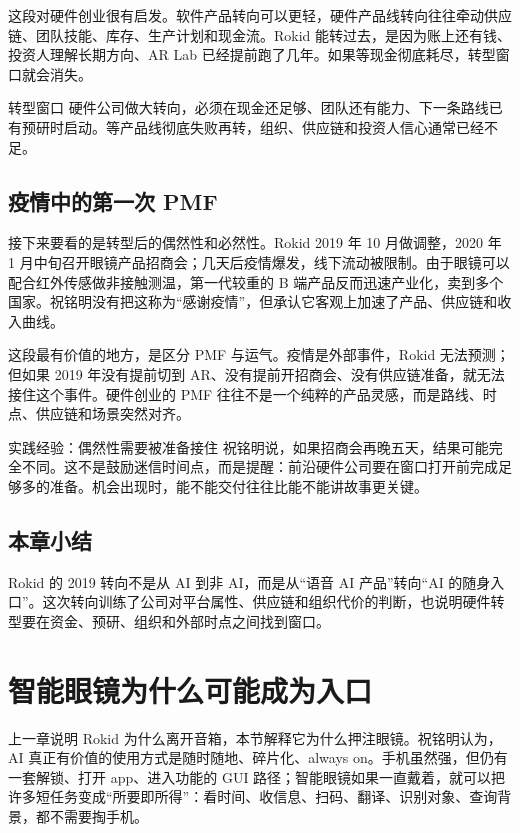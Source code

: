 \documentclass[a4paper]{article}
\begin{document}
这段对硬件创业很有启发。软件产品转向可以更轻，硬件产品线转向往往牵动供应链、团队技能、库存、生产计划和现金流。Rokid 能转过去，是因为账上还有钱、投资人理解长期方向、AR Lab 已经提前跑了几年。如果等现金彻底耗尽，转型窗口就会消失。

\begin{importantbox}{转型窗口}
硬件公司做大转向，必须在现金还足够、团队还有能力、下一条路线已有预研时启动。等产品线彻底失败再转，组织、供应链和投资人信心通常已经不足。
\end{importantbox}

\subsection{疫情中的第一次 PMF}

接下来要看的是转型后的偶然性和必然性。Rokid 2019 年 10 月做调整，2020 年 1 月中旬召开眼镜产品招商会；几天后疫情爆发，线下流动被限制。由于眼镜可以配合红外传感做非接触测温，第一代较重的 B 端产品反而迅速产业化，卖到多个国家。祝铭明没有把这称为“感谢疫情”，但承认它客观上加速了产品、供应链和收入曲线。

这段最有价值的地方，是区分 PMF 与运气。疫情是外部事件，Rokid 无法预测；但如果 2019 年没有提前切到 AR、没有提前开招商会、没有供应链准备，就无法接住这个事件。硬件创业的 PMF 往往不是一个纯粹的产品灵感，而是路线、时点、供应链和场景突然对齐。

\begin{knowledgebox}{实践经验：偶然性需要被准备接住}
祝铭明说，如果招商会再晚五天，结果可能完全不同。这不是鼓励迷信时间点，而是提醒：前沿硬件公司要在窗口打开前完成足够多的准备。机会出现时，能不能交付往往比能不能讲故事更关键。
\end{knowledgebox}

\subsection{本章小结}

Rokid 的 2019 转向不是从 AI 到非 AI，而是从“语音 AI 产品”转向“AI 的随身入口”。这次转向训练了公司对平台属性、供应链和组织代价的判断，也说明硬件转型要在资金、预研、组织和外部时点之间找到窗口。

\section{智能眼镜为什么可能成为入口}

上一章说明 Rokid 为什么离开音箱，本节解释它为什么押注眼镜。祝铭明认为，AI 真正有价值的使用方式是随时随地、碎片化、always on。手机虽然强，但仍有一套解锁、打开 app、进入功能的 GUI 路径；智能眼镜如果一直戴着，就可以把许多短任务变成“所要即所得”：看时间、收信息、扫码、翻译、识别对象、查询背景，都不需要掏手机。
\end{document}
